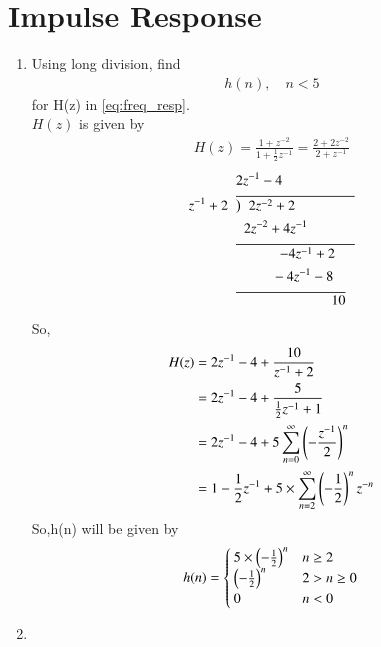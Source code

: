 \documentclass[journal,12pt,twocolumn]{IEEEtran}
\renewcommand\thesection{\arabic{section}}
\begin{document}
\section{Impulse Response}
\begin{enumerate}[label=\thesection.\arabic*]
	\item Using long division, 
	find
	\begin{align}
		h(n), \quad n < 5
	\end{align}
	for H(z) in 
	\eqref{eq:freq_resp}.\\
	\solution $H(z)$ is given by
	\begin{align}
		H(z)=\frac{1+z^{-2}}{1+\frac{1}{2}z^{-1}}=\frac{2+2z^{-2}}{2+z^{-1}}
	\end{align}
	\begin{align}
		&2z^{-1}-4\\	
		z^{-1}+2\hspace{2mm}&\overline{\big)\hspace{2mm} 2z^{-2}+2\hspace{15mm}}\\
		& \hspace{2mm} 2z^{-2}+4z^{-1}\\
		&\overline{\hspace{11mm}-4z^{-1}+2\hspace{5mm}}\\
		&\hspace{9mm}-4z^{-1}-8\\ 
		&\overline{\hspace{24mm}10}
	\end{align}
	So,
	\begin{align}
		H(z)&=2z^{-1}-4+\frac{10}{z^{-1}+2}\\
		&=2z^{-1}-4+\frac{5}{\frac{1}{2}z^{-1}+1}\\
		&=2z^{-1}-4+5\sum_{n=0}^\infty \left(-\frac{z^{-1}}{2}\right)^{n}\\
		&=1-\frac{1}{2}z^{-1}+5 \times \sum_{n=2}^\infty \left(-\frac{1}{2}\right)^{n}z^{-n}
	\end{align}
	So,h(n) will be given by 
	\begin{align}
		h(n)=\begin{cases}
			\label{eq:h_n_def}
			5\times \left(-\frac{1}{2}\right)^n  & n\geq 2\\
			\left(-\frac{1}{2}\right)^n  &2>n\geq0\\
			0 &n<0
		\end{cases}
	\end{align}
	\item \label{prob:impulse_resp}

\end{enumerate}
\end{document}
